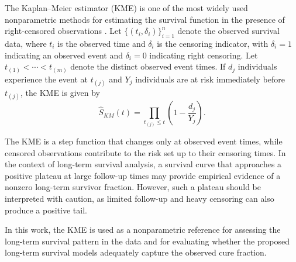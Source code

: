 The Kaplan--Meier estimator (KME) is one of the most widely used nonparametric
methods for estimating the survival function in the presence of right-censored
observations \cite{kaplan1958nonparametric}. Let $\{(t_i,\delta_i)\}_{i=1}^n$
denote the observed survival data, where $t_i$ is the observed time and
$\delta_i$ is the censoring indicator, with $\delta_i=1$ indicating an observed
event and $\delta_i=0$ indicating right censoring. Let
$t_{(1)}<\cdots<t_{(m)}$ denote the distinct observed event times. If $d_j$
individuals experience the event at $t_{(j)}$ and $Y_j$ individuals are at risk
immediately before $t_{(j)}$, the KME is given by
\begin{equation}
\label{eq:kaplan_meier}
\widehat{S}_{KM}(t)
=
\prod_{t_{(j)}\leq t}
\left(1-\frac{d_j}{Y_j}\right).
\end{equation}

The KME is a step function that changes only at observed event times, while
censored observations contribute to the risk set up to their censoring times.
In the context of long-term survival analysis, a survival curve that approaches
a positive plateau at large follow-up times may provide empirical evidence of a
nonzero long-term survivor fraction. However, such a plateau should be
interpreted with caution, as limited follow-up and heavy censoring can also
produce a positive tail.

In this work, the KME is used as a nonparametric reference for assessing the
long-term survival pattern in the data and for evaluating whether the proposed
long-term survival models adequately capture the observed cure fraction.
